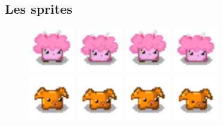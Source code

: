 \documentclass{article}
\begin{document}
    \subsection{Les sprites}
    \begin{figure}[h]
        \centering
        \includegraphics[height = 2cm]{risette/idle_0.png}
        \includegraphics[height = 2cm]{risette/idle_1.png}
        \includegraphics[height = 2cm]{risette/idle_2.png}
        \includegraphics[height = 2cm]{risette/idle_3.png}
        \\
        \includegraphics[height = 2cm]{haricot/idle_0.png}
        \includegraphics[height = 2cm]{haricot/idle_1.png}
        \includegraphics[height = 2cm]{haricot/idle_2.png}
        \includegraphics[height = 2cm]{haricot/idle_3.png}

\end{figure}
\end{document}
